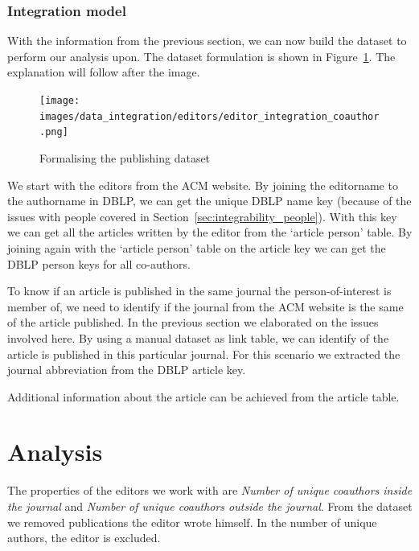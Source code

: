 \documentclass{ou-report}
\newcommand{\outline}[1]{{\color{blue} #1}}
\begin{document}
\subsubsection{Integration model}
With the information from the previous section, we can now build the dataset to
perform our analysis upon. The dataset formulation is shown in 
Figure~\ref{fig:editors_integration_coauthor}. The explanation will follow 
after the image.
\begin{figure}[H]
    \centering
    \texttt{[image: images/data\_integration/editors/editor\_integration\_coauthor.png]}
    \caption{Formalising the publishing dataset}
    \label{fig:editors_integration_coauthor}
\end{figure}
We start with the editors from the ACM website. By joining the editorname 
to the authorname in DBLP, we can get the unique DBLP name key (because of the 
issues with people covered in Section~\ref{sec:integrability_people}). With this 
key we can get all the articles written by the editor from the `article person'
table. By joining again with the `article person' table on the article key we 
can get the DBLP person keys for all co-authors.

To know if an article is published in the same journal the person-of-interest 
is member of, we need to identify if the journal from the ACM website is the 
same of the article published. In the previous section we elaborated on the 
issues involved here. By using a manual dataset as link table, we can identify
of the article is published in this particular journal. For this scenario we
extracted the journal abbreviation from the DBLP article key.

Additional information about the article can be achieved from the article table.

\section{Analysis}

The properties of the editors we work with are \textit{Number of unique 
coauthors inside the journal} and \textit{Number of unique 
coauthors outside the journal}. From the dataset we removed publications the 
editor wrote himself. In the number of unique authors, the editor is excluded.
\end{document}
